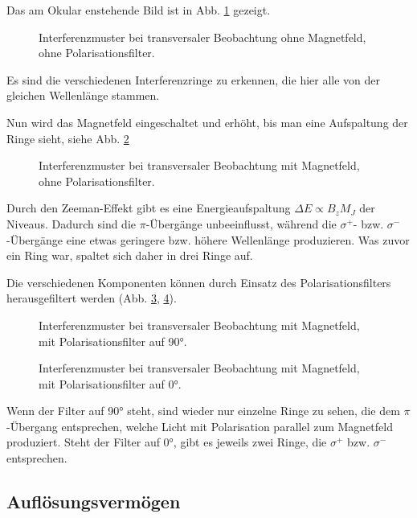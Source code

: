 \documentclass{article}
\begin{document}
\begin{multicols}{2}
Das am Okular enstehende Bild ist in Abb. \ref{fig:zeeman-transveral-ohne-ohne} gezeigt.
\begin{figure}[H]
  \centering
  \caption{Interferenzmuster bei transversaler Beobachtung ohne Magnetfeld, ohne Polarisationsfilter.}
  \label{fig:zeeman-transveral-ohne-ohne}
\end{figure}
Es sind die verschiedenen Interferenzringe zu erkennen, die hier alle von der gleichen Wellenlänge stammen.

Nun wird das Magnetfeld eingeschaltet und erhöht, bis man eine Aufspaltung der Ringe sieht, siehe Abb. \ref{fig:zeeman-transveral-mit-ohne}
\begin{figure}[H]
  \centering
  \caption{Interferenzmuster bei transversaler Beobachtung mit Magnetfeld, ohne Polarisationsfilter.}
  \label{fig:zeeman-transveral-mit-ohne}
\end{figure}
Durch den Zeeman-Effekt gibt es eine Energieaufspaltung $\Delta E \propto B_zM_J$ der Niveaus.
Dadurch sind die $\pi$-Übergänge unbeeinflusst, während die $\sigma^+$- bzw. $\sigma^-$-Übergänge
eine etwas geringere bzw. höhere Wellenlänge produzieren. Was zuvor ein Ring war, spaltet sich daher in drei Ringe auf.

Die verschiedenen Komponenten können durch Einsatz des Polarisationsfilters herausgefiltert werden (Abb. \ref{fig:zeeman-transveral-mit-90}, \ref{fig:zeeman-transveral-mit-0}).
\begin{figure}[H]
  \centering
  \caption{Interferenzmuster bei transversaler Beobachtung mit Magnetfeld, mit Polarisationsfilter auf \ang{90}.}
  \label{fig:zeeman-transveral-mit-90}
\end{figure}
\begin{figure}[H]
  \centering
  \caption{Interferenzmuster bei transversaler Beobachtung mit Magnetfeld, mit Polarisationsfilter auf \ang{0}.}
  \label{fig:zeeman-transveral-mit-0}
\end{figure}
Wenn der Filter auf \ang{90} steht, sind wieder nur einzelne Ringe zu sehen, die dem $\pi$-Übergang entsprechen,
welche Licht mit Polarisation parallel zum Magnetfeld produziert.
Steht der Filter auf \ang{0}, gibt es jeweils zwei Ringe, die $\sigma^+$ bzw. $\sigma^-$ entsprechen.

\subsection{Auflösungsvermögen}


\end{multicols}
\end{document}
